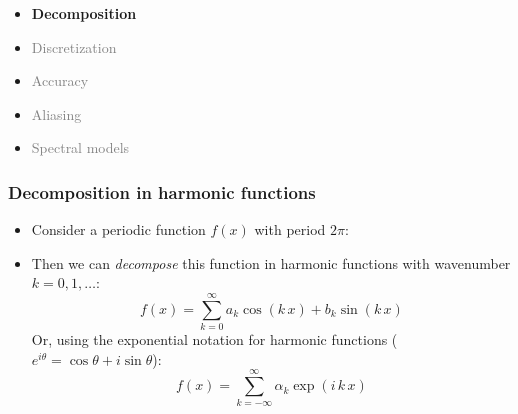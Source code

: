 \documentclass[aspectratio=43,9pt]{beamer}
\begin{document}
%
%
\begin{frame}
	\begin{itemize}
		\item {\bfseries Decomposition}
		\item \textcolor{gray}{Discretization}
		\item \textcolor{gray}{Accuracy}
		\item \textcolor{gray}{Aliasing}
		\item \textcolor{gray}{Spectral models}
	\end{itemize}
\end{frame}
%
%
\begin{frame}
	\frametitle{Decomposition in harmonic functions}
	\vfill\begin{itemize}
		\item Consider a periodic function $f(x)$ with period $2\pi$:
			\begin{center}
				\scalebox{.6}{\small
				}
			\end{center}\vfill
		\item Then we can \emph{decompose} this function in harmonic functions with wavenumber $k=0,1,\ldots$:
			\begin{equation*}
				f(x)=\sum_{k=0}^{\infty} a_k\cos(k\, x) + b_k\sin(k\, x)
			\end{equation*}\vspace*{-3mm}
			Or, using the exponential notation for harmonic functions ($e^{i\theta}=\cos\theta+i\sin\theta$):
			\begin{equation*}
				f(x)=\sum_{k=-\infty}^{\infty} \alpha_k \exp(i\,k\,x)
			\end{equation*}
	\end{itemize}\vfill
\end{frame}
%
%
\end{document}
